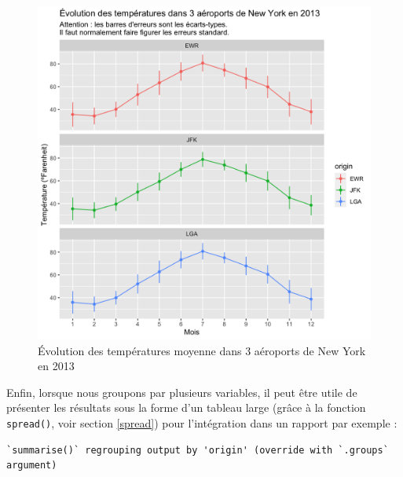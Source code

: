 \documentclass[
  a4paper,
]{article}
\newenvironment{Shaded}{\begin{snugshade}}{\end{snugshade}}
\newcommand{\DataTypeTok}[1]{\textcolor[rgb]{0.00,0.34,0.68}{#1}}
\newcommand{\KeywordTok}[1]{\textcolor[rgb]{0.12,0.11,0.11}{\textbf{#1}}}
\newcommand{\NormalTok}[1]{\textcolor[rgb]{0.12,0.11,0.11}{#1}}
\newcommand{\OperatorTok}[1]{\textcolor[rgb]{0.12,0.11,0.11}{#1}}
\newcommand{\OtherTok}[1]{\textcolor[rgb]{0.00,0.43,0.16}{#1}}
\newcommand{\StringTok}[1]{\textcolor[rgb]{0.75,0.01,0.01}{#1}}
\begin{document}
\begin{figure}[htpb]

{\centering \includegraphics[width=0.9\linewidth]{figure/errorbars4-1} 

}

\caption{Évolution des températures moyenne dans 3 aéroports de New York en 2013}\label{fig:errorbars4}
\end{figure}

Enfin, lorsque nous groupons par plusieurs variables, il peut être utile de présenter les résultats sous la forme d'un tableau large (grâce à la fonction \texttt{spread()}, voir section \ref{spread}) pour l'intégration dans un rapport par exemple :

\begin{Shaded}
\end{Shaded}

\begin{verbatim}
`summarise()` regrouping output by 'origin' (override with `.groups` argument)
\end{verbatim}
\end{document}
